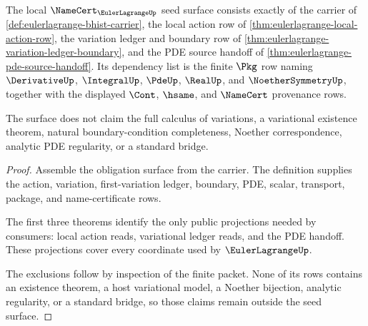 \begin{theorem}
\label{thm:eulerlagrange-namecert-obligation-surface}
The local $\NameCert_{\EulerLagrangeUp}$ seed surface consists exactly of the carrier of \autoref{def:eulerlagrange-bhist-carrier}, the local action row of \autoref{thm:eulerlagrange-local-action-row}, the variation ledger and boundary row of \autoref{thm:eulerlagrange-variation-ledger-boundary}, and the PDE source handoff of \autoref{thm:eulerlagrange-pde-source-handoff}. Its dependency list is the finite $\Pkg$ row naming $\DerivativeUp$, $\IntegralUp$, $\PdeUp$, $\RealUp$, and $\NoetherSymmetryUp$, together with the displayed $\Cont$, $\hsame$, and $\NameCert$ provenance rows.

The surface does not claim the full calculus of variations, a variational existence theorem, natural boundary-condition completeness, Noether correspondence, analytic PDE regularity, or a standard bridge.
\end{theorem}
\begin{proof}
Assemble the obligation surface from the carrier. The definition supplies the action, variation, first-variation ledger, boundary, PDE, scalar, transport, package, and name-certificate rows.

The first three theorems identify the only public projections needed by consumers: local action reads, variational ledger reads, and the PDE handoff. These projections cover every coordinate used by $\EulerLagrangeUp$.

The exclusions follow by inspection of the finite packet. None of its rows contains an existence theorem, a host variational model, a Noether bijection, analytic regularity, or a standard bridge, so those claims remain outside the seed surface.
\end{proof}


